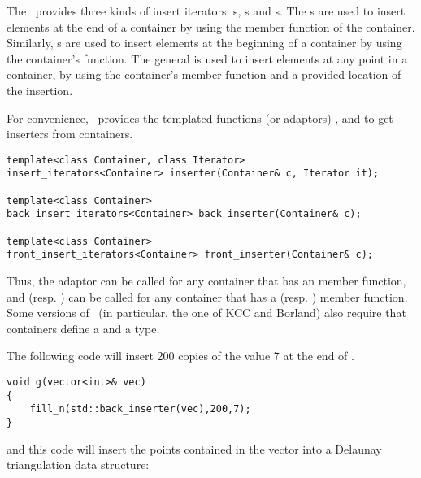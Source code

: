 The \stl\ provides three kinds of insert iterators: s,
s and s.
The s are used to insert elements at the end of 
a container by using the  member function of the container.
Similarly, s are used to insert elements at the
beginning of a container by using the container's 
function.  The general  is used to insert elements
at any point in a container, by using the container's  
member function and a provided location of the insertion.

For convenience, \stl\  provides the templated
functions (or adaptors) 
, 
and  to get inserters from containers.

\begin{verbatim}
template<class Container, class Iterator> 
insert_iterators<Container> inserter(Container& c, Iterator it); 

template<class Container> 
back_insert_iterators<Container> back_inserter(Container& c); 

template<class Container> 
front_insert_iterators<Container> front_inserter(Container& c); 
\end{verbatim}

Thus, the  adaptor can be called for any container that
has an  member function, and 
(resp. ) can be called for any container that has a
 (resp. ) member function.  Some versions
of \stl\ (in particular, the one of KCC and Borland) also require that 
containers define a  and a  type.

The following code will insert 200 copies of the value 7 at the end of
.
\begin{verbatim}
void g(vector<int>& vec)
{
    fill_n(std::back_inserter(vec),200,7);
}
\end{verbatim}
and this code will insert the points contained in the vector 
into a Delaunay triangulation data structure:

